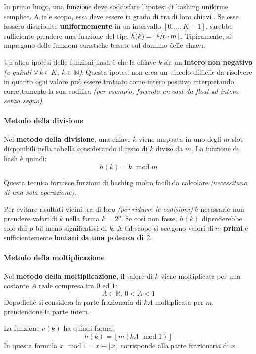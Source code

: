 \documentclass[italian, 10pt]{article}
\DeclareMathOperator{\modop}{\ mod}
\begin{document}
In primo luogo, una funzione deve soddisfare l'ipotesi di hashing uniforme semplice.
A tale scopo, essa deve essere in grado di  tra di loro chiavi .
Se esse fossero distribuite \textbf{uniformemente} in un intervallo \([0, \ldots, K-1]\), sarebbe sufficiente prendere una funzione del tipo \(h(k) = \lfloor \sfrac{k}{L} \cdot m \rfloor\).
Tipicamente, si impiegano delle funzioni euristiche basate sul dominio delle chiavi.

Un'altra ipotesi delle funzioni hash è che la chiave \(k\) sia un \textbf{intero non negativo} \textit{(e quindi \(\forall \, k \in K, \ k \in \mathbb{N}\))}.
Questa ipotesi non crea un vincolo difficile da risolvere in quanto ogni valore può essere trattato come intero positivo interpretando correttamente la sua codifica \textit{(per esempio, facendo un cast da float ad intero senza segno)}.

\paragraph{Metodo della divisione}

Nel \textbf{metodo della divisione}, una chiave \(k\) viene mappata in uno degli \(m\) slot disponibili nella tabella considerando il resto di \(k\) diviso da \(m\).
La funzione di hash è quindi:
\[ h(k) = k \modop m \]

\bigskip
Questa tecnica fornisce funzioni di hashing molto facili da calcolare \textit{(necessitano di una sola operazione)}.

Per evitare risultati vicini tra di loro \textit{(per ridurre le collisioni)} è necessario non prendere valori di \(k\) nella forma \(k = 2^p\).
Se così non fosse, \(h(k)\) dipenderebbe solo dai \(p\) bit meno significativi di \(k\).
A tal scopo si scelgono valori di \(m\) \textbf{primi} e sufficientemente \textbf{lontani da una potenza di \(2\)}.

\paragraph{Metodo della moltiplicazione}

Nel \textbf{metodo della moltiplicazione}, il valore di \(k\) viene moltiplicato per una costante \(A\) reale compresa tra \(0\) ed \(1\):
\[ A \in \mathbb{R},\ 0 < A < 1 \]
Dopodiché si considera la parte frazionaria di \(kA\) moltiplicata per \(m\), prendendone la parte intera.

La funzione \(h(k)\) ha quindi forma:
\[h(k) = \left\lfloor m (kA \modop 1) \right\rfloor \]
In questa formula \(x \modop 1 = x - \lfloor x \rfloor\) corrisponde alla parte frazionaria di \(x\).
\end{document}
